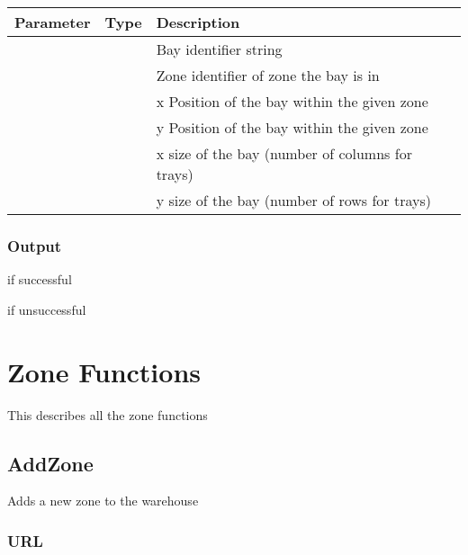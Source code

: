 \documentclass[letterpaper,10pt,english]{sphinxmanual}
\begin{document}
\begin{savenotes}\sphinxattablestart
\centering
\begin{tabulary}{\linewidth}[t]{|T|T|T|}
\hline
\sphinxstyletheadfamily 
Parameter
&\sphinxstyletheadfamily 
Type
&\sphinxstyletheadfamily 
Description
\\
\hline
{}
&
&
Bay identifier string
\\
\hline
{}
&
&
Zone identifier of zone the bay is in
\\
\hline
{}
&
&
x Position of the bay within the given zone
\\
\hline
{}
&
&
y Position of the bay within the given zone
\\
\hline
{}
&
&
x size of the bay (number of columns for trays)
\\
\hline
{}
&
&
y size of the bay (number of rows for trays)
\\
\hline
\end{tabulary}
\par
\sphinxattableend\end{savenotes}


\subsection{Output}
\label{\detokenize{addBay:output}}
 if successful

 if unsuccessful


\chapter{Zone Functions}
\label{\detokenize{index:zone-functions}}
This describes all the zone functions


\section{AddZone}
\label{\detokenize{addZone:addzone}}\label{\detokenize{addZone::doc}}
Adds a new zone to the warehouse


\subsection{URL}
\label{\detokenize{addZone:url}}
\end{document}
